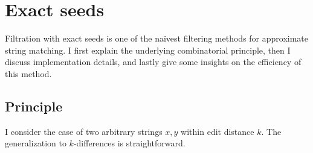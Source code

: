 


\section{Exact seeds}
\label{sec:filtering:exact}

Filtration with exact seeds is one of the na\"ivest filtering methods for approximate string matching.
I first explain the underlying combinatorial principle, then I discuss implementation details, and lastly give some insights on the efficiency of this method.

\subsection{Principle}

I consider the case of two arbitrary strings $x,y$ within edit distance $k$.
The generalization to $k$-differences is straightforward.

